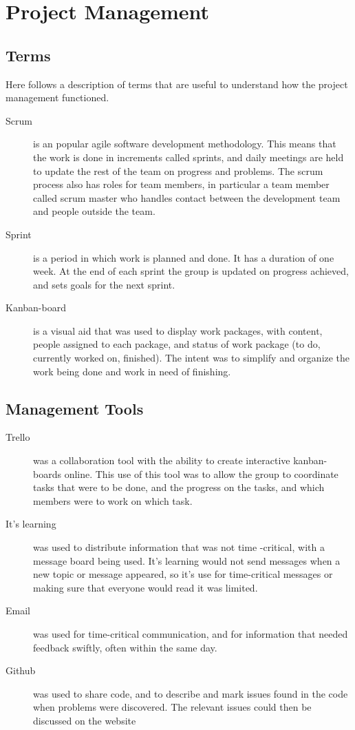 \chapter{Project Management}
\section{Terms}
Here follows a description of terms that are useful to understand how the project management functioned. 
\begin{description}
\item[Scrum] \label{def:scrum}is an popular agile software development methodology. This means that the work is done in increments called sprints, and daily meetings are held to update the rest of the team on progress and problems. The scrum process also has roles for team members, in particular a team member called scrum master who handles contact between the development team and people outside the team.
\item[Sprint] \label{def:sprint} is a period in which work is planned and done. It has a duration of one week. At the end of each sprint the group is updated on progress achieved, and sets goals for the next sprint. 
\item[Kanban-board] \label{def:kanban} is a visual aid that was used to display work packages, with content, people assigned to each package, and status of work package (to do, currently worked on, finished). The intent was to simplify and organize the work being done and work in need of finishing.
\end{description}
%
\section{Management Tools}
\begin{description}
\item[Trello]  \label{def:trello} was a collaboration tool with the ability to create interactive kanban-boards online. This use of this tool was to allow the group to coordinate tasks that were to be done, and the progress on the tasks, and which members were to work on which task. 
\item[It's learning] was used to distribute information that was not time -critical, with a message board being used. It's learning would not send messages when a new topic or message appeared, so it's use for time-critical messages or making sure that everyone would read it was limited. 
\item[Email] was used for time-critical communication, and for information that needed feedback swiftly, often within the same day.
\item[Github] \label{def:github} was used to share code, and to describe and mark issues found in the code when problems were discovered. The relevant issues could then be discussed on the website
\end{description}
%
